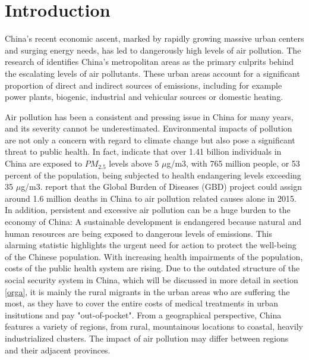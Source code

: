 \documentclass[
]{article}
\begin{document}
	\hypertarget{introduction}{%
		\section{Introduction}\label{introduction}}
	China's recent economic ascent, marked by rapidly growing massive urban centers and surging energy needs, has led to dangerously high levels of air pollution. The research of \cite{chan2008air} identifies China's metropolitan areas as the primary culprits behind the escalating levels of air pollutants. These urban areas account for a significant proportion of direct and indirect sources of emissions, including for example power plants, biogenic, industrial and vehicular sources or domestic heating. 

	Air pollution has been a consistent and pressing issue in China for many years, and its severity cannot be underestimated. Environmental impacts of pollution are not only a concern with regard to climate change but also pose a significant threat to public health. In fact, \cite{maruyama2022air} indicate that over 1.41 billion individuals in China are exposed to $PM_{2.5}$ levels above 5 $\mu$g/m3, with 765 million people, or 53 percent of the population, being subjected to health endangering levels exceeding 35 $\mu$g/m3.
	\cite{song_air_2017} report that the Global Burden of Diseases (GBD) project could assign around 1.6 million deaths in China to air pollution related causes alone in 2015. In addition, persistent and excessive air pollution can be a huge burden to the economy of China: A sustainable development is endangered because natural and human resources are being exposed to dangerous levels of  emissions. This alarming statistic highlights the urgent need for action to protect the well-being of the Chinese population. With increasing health impairments of the population, costs of the public health system are rising. 
	Due to the outdated structure of the social security system in China, which will be discussed in more detail in section \ref{orga}, it is mainly the rural migrants in the urban areas who are suffering the most, as they have to cover the entire costs of medical treatments in urban insitutions and pay "out-of-pocket". 
	From a geographical perspective, China features a variety of regions, from rural, mountainous locations to coastal, heavily industrialized clusters. The impact of air pollution may differ between regions and their adjacent provinces.\\ 
\end{document}
